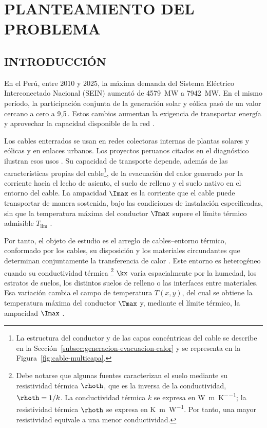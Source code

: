 \chapter{PLANTEAMIENTO DEL PROBLEMA}
\thispagestyle{empty}

\section{INTRODUCCIÓN}
\label{sec:diagnostico}

En el Perú, entre 2010 y 2025, la máxima demanda del Sistema Eléctrico Interconectado Nacional (SEIN) aumentó de \SI{4579}{\mega\watt} a \SI{7942}{\mega\watt}. En el mismo período, la participación conjunta de la generación solar y eólica pasó de un valor cercano a cero a 9,5\,\pct{}. Estos cambios aumentan la exigencia de transportar energía y aprovechar la capacidad disponible de la red \parencites{minem2025anuario2024}{minem2025indicadoresDiciembre}{coesMaximaDemanda}{iea2025transmissiongrid}.

Los cables enterrados se usan en redes colectoras internas de plantas solares y eólicas y en enlaces urbanos. Los proyectos peruanos citados en el diagnóstico ilustran esos usos \parencites{coes2021puntaLomitasEO}{coes2022planTransmision2023_2032}{proinversion2026palian}. Su capacidad de transporte depende, además de las características propias del cable\footnote{La estructura del conductor y de las capas concéntricas del cable se describe en la Sección~\ref{subsec:generacion-evacuacion-calor} y se representa en la Figura~\ref{fig:cable-multicapa}.}, de la evacuación del calor generado por la corriente hacia el lecho de asiento, el suelo de relleno y el suelo nativo en el entorno del cable. La ampacidad \(\Imax\) es la corriente que el cable puede transportar de manera sostenida, bajo las condiciones de instalación especificadas, sin que la temperatura máxima del conductor \(\Tmax\) supere el límite térmico admisible \(T_{\mathrm{lim}}\) \parencites[cláusulas~4--5]{iec60287}[3--5]{enescu2020}.

Por tanto, el objeto de estudio es el arreglo de cables--entorno térmico, conformado por los cables, su disposición y los materiales circundantes que determinan conjuntamente la transferencia de calor \parencites[1--3]{enescu2020}[41--42]{cigre2025}. Este entorno es heterogéneo cuando su conductividad térmica \footnote{Debe notarse que algunas fuentes caracterizan el suelo mediante su resistividad térmica \(\rhoth\), que es la inversa de la conductividad, \(\rhoth=1/k\). La conductividad térmica $k$ se expresa en \si{\watt\per\metre\per\kelvin}; la resistividad térmica $\rhoth$ se expresa en \si{\kelvin\metre\per\watt}. Por tanto, una mayor resistividad equivale a una menor conductividad.} \(\kx\) varía espacialmente por la humedad, los estratos de suelos, los distintos suelos de relleno o las interfaces entre materiales. Esa variación cambia el campo de temperatura \(T(x,y)\), del cual se obtiene la temperatura máxima del conductor \(\Tmax\) y, mediante el límite térmico, la ampacidad \(\Imax\) \parencites[3--4]{enescu2021}[1,6--7]{khumalo2025}[3]{xing2023}.

